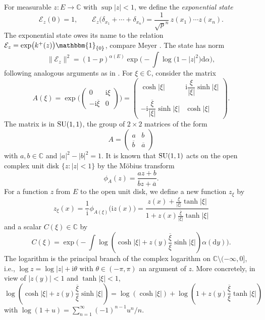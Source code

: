 \documentclass[10pt,a4paper]{amsart}
\numberwithin{equation}{section}
\newcommand{\C}{\mathbb{C}}
\newcommand{\dd}{\mathrm{d}} %
\newcommand{\1}{\mathbbm{1}}
\begin{document}
For measurable $z\colon E\to \C$ with $\sup |z|<1$, we define the \emph{exponential state}
\[
	\mathcal E_z(0) = 1, \qquad \mathcal E_z\bigl(\delta_{x_1}+\cdots + \delta_{x_n}\bigr) = \frac{1}{\sqrt p^n} \, z(x_1)\cdots z(x_n).
\]
The exponential state owes its name to the relation $\mathcal E_z = \exp\bigl( k^+(z)\bigr)\1_{\{0\}}$, compare Meyer \mbox{\cite[Sec\-tion IV.1]{meyer2006quantum}}. The state has norm
\[
	\|\mathcal E_z\|^2 = (1-p)^{\alpha(E)} \exp\biggl( - \int \log \bigl(1-|z|^2\bigr) \dd \alpha \biggr),
\]
following analogous arguments as in \cite[equation~(5.7)]{IntertwiningConsistent}. For $\xi\in \C$, consider the matrix
\[
	A(\xi) = \exp\biggl( \begin{pmatrix} 0 & \mathrm i \xi \\ - \mathrm i \overline{\xi} &0 \end{pmatrix}\biggr)
	= \begin{pmatrix} \cosh |\xi| & \mathrm i \dfrac{\xi}{|\xi|} \sinh |\xi| \\
	- \mathrm i \dfrac{\overline{\xi}}{|\xi|} \sinh |\xi| & \cosh |\xi|\end{pmatrix}.
\]
The matrix is in ${\rm SU}(1,1)$, the group of $2\times 2$ matrices of the form
\[
	A = \begin{pmatrix} a & b \\ \overline b & \overline a \end{pmatrix}
\]
with $a,b\in \C$ and $|a|^2 - |b|^2 = 1$. It is known that ${\rm SU}(1,1)$ acts on the open complex unit disk $\{z\colon|z|<1\}$ by the M{\"o}bius transform
\[
	\phi_A(z) = \frac{a z + b}{\overline b z + \overline a}.
\]
For a function $z$ from $E$ to the open unit disk, we define a new function $z_\xi$ by
\[
	z_\xi(x) = \frac 1 {\mathrm i} \phi_{A(\xi)}\bigl(\mathrm i z(x)\bigr)
	= \frac{z(x) + \frac{\xi}{|\xi|} \tanh |\xi|}{1+ z(x) \frac{\overline{\xi}}{|\xi|} \tanh |\xi| }
\]
and a scalar $C(\xi) \in \mathbb C$ by
\[
	C(\xi) = \exp\biggl( - \int \log\left( \cosh |\xi| + z(y) \frac{\overline \xi}{\xi} \sinh |\xi|\right) \alpha(\dd y) \biggr).
\]
The logarithm is the principal branch of the complex logarithm on $\C \setminus (-\infty,0]$, i.e., $\log z = \log |z| +\mathrm i \theta$ with $\theta\in (-\pi,\pi)$ an argument of $z$. More concretely, in view of $|z(y)|<1$ and $\tanh|\xi|<1$,
\[
	\log\left( \cosh |\xi| + z(y) \frac{\overline \xi}{\xi} \sinh |\xi|\right)
	= \log (\cosh|\xi|) + \log \left( 1 + z(y) \frac{\overline \xi}{\xi} \tanh |\xi|\right)
\]
with $\log(1+u) = \sum_{n=1}^\infty (-1)^{n-1} u^n/n$.
\end{document}
